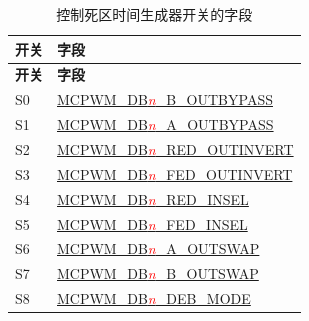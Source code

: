 \begin{longtable}[c]{ |p{4cm}|p{6cm}| }
    \caption{控制死区时间生成器开关的字段}
    \label{tab:mcpwm-s-dt}
    \\\hline
    \rowcolor{lightgray}
    \textbf{开关}
    & \textbf{字段}
    \\\hline
    \endfirsthead
    \hline
    \rowcolor{lightgray}   
    \textbf{开关}
    & \textbf{字段}
    \\\hline
    \endhead
    \hline
    \endfoot
    S0
    & \hyperref[fielddesc:MCPWMDBNBOUTBYPASS]{MCPWM\_DB\textcolor{red}{\it{n}}\_B\_OUTBYPASS}
    \\\hline
    S1
    & \hyperref[fielddesc:MCPWMDBNAOUTBYPASS]{MCPWM\_DB\textcolor{red}{\it{n}}\_A\_OUTBYPASS}
    \\\hline
    S2
    & \hyperref[fielddesc:MCPWMDBNREDOUTINVERT]{MCPWM\_DB\textcolor{red}{\it{n}}\_RED\_OUTINVERT}
    \\\hline
    S3
    & \hyperref[fielddesc:MCPWMDBNFEDOUTINVERT]{MCPWM\_DB\textcolor{red}{\it{n}}\_FED\_OUTINVERT}
    \\\hline
    S4
    & \hyperref[fielddesc:MCPWMDBNREDINSEL]{MCPWM\_DB\textcolor{red}{\it{n}}\_RED\_INSEL}
    \\\hline
    S5
    & \hyperref[fielddesc:MCPWMDBNFEDINSEL]{MCPWM\_DB\textcolor{red}{\it{n}}\_FED\_INSEL}
    \\\hline
    S6
    & \hyperref[fielddesc:MCPWMDBNAOUTSWAP]{MCPWM\_DB\textcolor{red}{\it{n}}\_A\_OUTSWAP}
    \\\hline
    S7
    & \hyperref[fielddesc:MCPWMDBNBOUTSWAP]{MCPWM\_DB\textcolor{red}{\it{n}}\_B\_OUTSWAP}
    \\\hline
    S8
    & \hyperref[fielddesc:MCPWMDBNDEBMODE]{MCPWM\_DB\textcolor{red}{\it{n}}\_DEB\_MODE}
    \\\hline
\end{longtable}